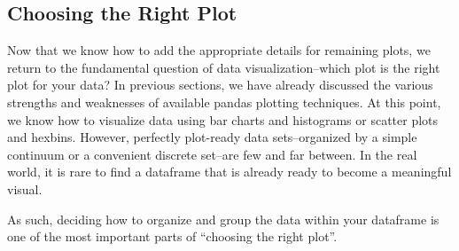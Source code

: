 \documentclass[12pt]{article}
\begin{document}

\subsection*{Choosing the Right Plot}
Now that we know how to add the appropriate details for remaining plots, we return to the fundamental question of data visualization--which plot is the right plot for your data? 
In previous sections, we have already discussed the various strengths and weaknesses of available pandas plotting techniques.
At this point, we know how to visualize data using bar charts and histograms or scatter plots and hexbins. 
However, perfectly plot-ready data sets--organized by a simple continuum or a convenient discrete set--are few and far between.
In the real world, it is rare to find a dataframe that is already ready to become a meaningful visual.

As such, deciding how to organize and group the data within your dataframe is one of the most important parts of ``choosing the right plot''.

\end{document}
